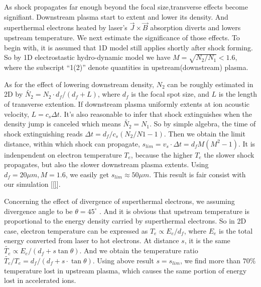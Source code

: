 \documentclass[12pt]{iopart}
\begin{document}
As shock propagates far enough beyond the focal size,transverse effects become signifiant. Downstream plasma start to extent and lower its density. And superthermal electrons heated by laser's $\vec{J}\times \vec{B} $ absorption\cite{gibbon_short_2005} diverts and lowers upstream temperature. We next estimate the significance of those effects. To begin with, it is assumed that 1D model still applies shortly after shock forming. So by 1D electrostastic hydro-dynamic model\cite{zhang_quasi-monoenergetic_2016,tidman_shock_1971} we have $M=\sqrt{N_2 / N_1}<1.6$, where the subscript ``1(2)'' denote quantities in upstream(downstream) plasma. 

As for the effect of lowering downstream density, $N_2$ can be roughly estimated in 2D by $\tilde{N_2}=N_2 \cdot d_f\big/(d_f+L)$, where $d_f$ is the focal spot size, and $L$ is the length of transverse extention. If downstream plasma uniformly extents at ion acoustic velocity, $L=c_s\Delta t$. It's also reasonable to infer that shock extinguishes when the density jump is canceled which means $\tilde{N_2}=N_1$. So by simple algebra, the time of shock extinguishing reads $\Delta t=d_f/c_s(N_2/N1-1)$. Then we obtain the limit distance, within which shock can propagate, $s_{lim}=v_s \cdot \Delta t=d_fM(M^2-1)$. It is indenpendent on electron temperature $T_e$, because the higher $T_e$ the slower shock propagates, but also the slower downstream plasma extents. Using $d_f=20\mu m,M=1.6$, we easily get $s_{lim}\approx 50\mu m$. This result is fair consist with our simulation [\ref{}].

Concerning the effect of divergence of superthermal electrons, we assuming divergence angle to be $\theta=45^\circ$  \cite{gibbon_short_2005}. And it is obvious that upstream temperature is proportional to the energy density carried by superthermal electrons. So in 2D case, electron temperature can be expressed as $T_e\propto E_e/d_f$, where $E_e$ is the total energy converted from laser to hot electrons. At distance $s$, it is the same $\tilde{T_e} \propto E_e/(d_f+s\tan{\theta})$. And we obtain the temperature ratio $\tilde{T_e}/T_e=d_f/(d_f+s\cdot\tan{\theta})$. Using above result $s=s_{lim}$, we find more than $70\%$ temperature lost in upstream plasma, which causes the same portion of energy lost in accelerated ions.
\end{document}
